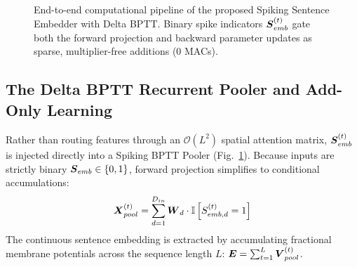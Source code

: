 \documentclass[runningheads]{llncs}
\begin{document}
\begin{figure}[t]
{%
}
\caption{End-to-end computational pipeline of the proposed Spiking Sentence Embedder with Delta BPTT. Binary spike indicators $\boldsymbol{S}_{emb}^{(t)}$ gate both the forward projection and backward parameter updates as sparse, multiplier-free additions (0 MACs).}
\label{fig:architecture}
\end{figure}

\subsection{The Delta BPTT Recurrent Pooler and Add-Only Learning}
Rather than routing features through an $\mathcal{O}(L^2)$ spatial attention matrix, $\boldsymbol{S}_{emb}^{(t)}$ is injected directly into a Spiking BPTT Pooler (Fig.~\ref{fig:architecture}). Because inputs are strictly binary $\boldsymbol{S}_{emb} \in \{0, 1\}$, forward projection simplifies to conditional accumulations:
\begin{equation}
\boldsymbol{X}_{pool}^{(t)} = \sum_{d=1}^{D_{in}} \boldsymbol{W}_{d} \cdot \mathbb{I}\left[ S_{emb, d}^{(t)} = 1 \right]
\end{equation}
The continuous sentence embedding is extracted by accumulating fractional membrane potentials across the sequence length $L$: $\boldsymbol{E} = \sum_{t=1}^L \boldsymbol{V}_{pool}^{(t)}$.
\end{document}
